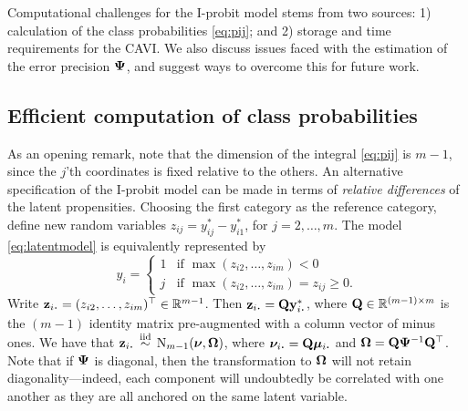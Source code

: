 Computational challenges for the I-probit model stems from two sources: 1) calculation of the class probabilities \cref{eq:pij}; and 2) storage and time requirements for the CAVI.
We also discuss issues faced with the estimation of the error precision ${\bm\Psi}$, and suggest ways to overcome this for future work.

\subsection{Efficient computation of class probabilities}
\label{sec:mnint}


As an opening remark, note that the dimension of the integral \cref{eq:pij} is $m-1$, since the $j$'th coordinates is fixed relative to the others.
An alternative specification of the I-probit model can be made in terms of \emph{relative differences} of the latent propensities.
Choosing the first category as the reference category, define new random variables $z_{ij} = y_{ij}^* - y_{i1}^*$, for $j = 2,\dots,m$. 
The model \cref{eq:latentmodel} is equivalently represented by
\begin{equation}
  y_i = 
  \begin{cases}
    1 & \text{if } \max (z_{i2},\dots,z_{im}) < 0 \\
    j & \text{if } \max (z_{i2},\dots,z_{im}) = z_{ij} \geq 0.
  \end{cases}
\end{equation} 
Write $\bz_{i\bigcdot} = (z_{i2},\dots,z_{im})^\top \in \bbR^{m-1}$.
Then $\bz_{i\bigcdot} = \bQ\by^*_{i\bigcdot}$, where ${\mathbf Q} \in \mathbb{R}^{(m-1)\times m}$  is the $(m-1)$ identity matrix pre-augmented with a column vector of minus ones.
We have that $\bz_{i\bigcdot} \iid \N_{m-1}(\bnu, \bOmega)$, where $\bnu_{i\bigcdot} = \bQ\bmu_{i\bigcdot}$ and ${\bm\Omega} = {\mathbf Q}{\bm\Psi}^{-1}{\mathbf Q}^\top$.
Note that if ${\bm\Psi}$ is diagonal, then the transformation to ${\bm\Omega}$ will not retain diagonality---indeed, each component will undoubtedly be correlated with one another as they are all anchored on the same latent variable.

